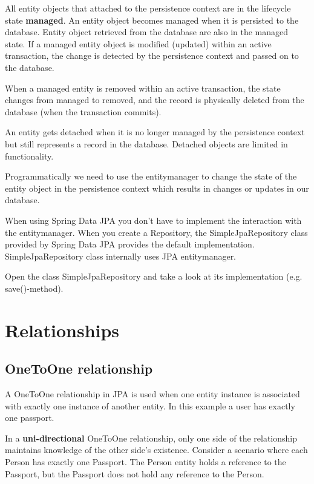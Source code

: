 All entity objects that attached to the persistence context are in the lifecycle state \textbf{managed}. An entity object becomes managed when it is persisted to the database. Entity object retrieved from the database are also in the managed state.
If a managed entity object is modified (updated) within an active transaction, the change is detected by the persistence context and passed on to the database.

When a managed entity is removed within an active transaction, the state changes from managed to removed, and the record is physically deleted from the database (when the transaction commits).

An entity gets detached when it is no longer managed by the persistence context but still represents a record in the database.
Detached objects are limited in functionality.

 
Programmatically we need to use the entitymanager to change the state of the entity object in the persistence context which results in changes or updates in our database. 

When using Spring Data JPA you don't have to implement the interaction with the entitymanager. When you create a Repository, the SimpleJpaRepository class provided by Spring Data JPA provides the default implementation. SimpleJpaRepository class internally uses JPA entitymanager.

\begin{oefening}
Open the class SimpleJpaRepository and take a look at its implementation (e.g. save()-method).
\end{oefening}


\section{Relationships}

\subsection{OneToOne relationship}

A OneToOne relationship in JPA is used when one entity instance is associated with exactly one instance of another entity.  In this example a user has exactly one passport.

In a \textbf{uni-directional} OneToOne relationship, only one side of the relationship maintains knowledge of the other side’s existence. Consider a scenario where each Person has exactly one Passport. The Person entity holds a reference to the Passport, but the Passport does not hold any reference to the Person.

